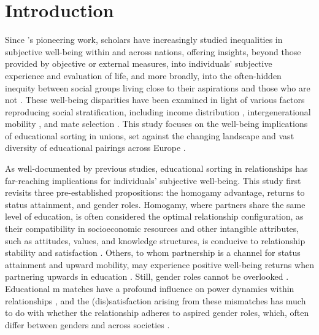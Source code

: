 \section{Introduction}
\label{sec:ch3-introduction}

Since \citeauthor{easterlinDoesEconomicGrowth1974}'s \citeyear{easterlinDoesEconomicGrowth1974} pioneering work, scholars have increasingly studied inequalities in subjective well-being within and across nations, offering insights, beyond those provided by objective or external measures, into individuals' subjective experience and evaluation of life, and more broadly, into the often-hidden inequity between social groups living close to their aspirations and those who are not \parencite{alesinaInequalityHappinessAre2004,dienerNationalDifferencesReported1995,dienerSubjectiveWellBeingScience2009}. These well-being disparities have been examined in light of various factors reproducing social stratification, including income distribution \parencite{hochmanImpactWealthSubjective2013,ngamabaIncomeInequalitySubjective2018}, intergenerational mobility \parencite{schuckDoesIntergenerationalEducational2018,wangEducationalMobilitySubjective2024}, and mate selection \parencite{potarcaAreWomenHypogamous2022,zhaoPartnersEducationalPairings2022}. This study focuses on the well-being implications of educational sorting in unions, set against the changing landscape and vast diversity of educational pairings across Europe \parencite{eratEducationalAssortativeMating2021,esteveEducationalHomogamyGap2013,esteveEndHypergamyGlobal2016}.

As well-documented by previous studies, educational sorting in relationships has far-reaching implications for individuals' subjective well-being. This study first revisits three pre-established propositions: the homogamy advantage, returns to status attainment, and gender roles. Homogamy, where partners share the same level of education, is often considered the optimal relationship configuration, as their compatibility in socioeconomic resources and other intangible attributes, such as attitudes, values, and knowledge structures, is conducive to relationship stability and satisfaction \parencite{gauntCoupleSimilarityMarital2006,kalmijnIntermarriageHomogamyCauses1998,keizerAreEqualsHappier2015}. Others, to whom partnership is a channel for status attainment and upward mobility, may experience positive well-being returns when partnering upwards in education \parencite{schwartzMarryingMarryingStatus2016,zhaoPartnersEducationalPairings2022}. Still, gender roles cannot be overlooked \parencite{centersConjugalPowerStructure1971,westDoingGender1987}. Educational m matches have a profound influence on power dynamics within relationships \parencite{eeckhautEducationalHeterogamyDivision2014}, and the (dis)satisfaction arising from these mismatches has much to do with whether the relationship adheres to aspired gender roles, which, often differ between genders and across societies \parencite{knightOneEgalitarianismSeveral2017,vanbavelReversalGenderGap2018}.

